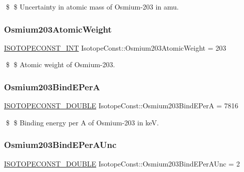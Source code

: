 \$ \$ Uncertainty in atomic mass of Osmium-\/203 in amu. \mbox{\label{group___isotope_const-_osmium-_os203_ga664f298f5b8b5d7513dc6c70eebc9fa4}} 
\subsubsection{\texorpdfstring{Osmium203\+Atomic\+Weight}{Osmium203AtomicWeight}}
{\footnotesize\ttfamily \mbox{\hyperlink{group___isotope_const-_macros_ga5f18360b3e99483a35c32d789e62621c}{I\+S\+O\+T\+O\+P\+E\+C\+O\+N\+S\+T\+\_\+\+I\+NT}} Isotope\+Const\+::\+Osmium203\+Atomic\+Weight = 203}

\$ \$ Atomic weight of Osmium-\/203. \mbox{\label{group___isotope_const-_osmium-_os203_gafa7d3682e9b466a6c3dd6be62c3f1786}} 
\subsubsection{\texorpdfstring{Osmium203\+Bind\+E\+PerA}{Osmium203BindEPerA}}
{\footnotesize\ttfamily \mbox{\hyperlink{group___isotope_const-_macros_ga8f45a7272ce02c0b4c65c44636ed719a}{I\+S\+O\+T\+O\+P\+E\+C\+O\+N\+S\+T\+\_\+\+D\+O\+U\+B\+LE}} Isotope\+Const\+::\+Osmium203\+Bind\+E\+PerA = 7816}

\$ \$ Binding energy per A of Osmium-\/203 in keV. \mbox{\label{group___isotope_const-_osmium-_os203_ga9592977eba787eabb44dea6702861578}} 
\subsubsection{\texorpdfstring{Osmium203\+Bind\+E\+Per\+A\+Unc}{Osmium203BindEPerAUnc}}
{\footnotesize\ttfamily \mbox{\hyperlink{group___isotope_const-_macros_ga8f45a7272ce02c0b4c65c44636ed719a}{I\+S\+O\+T\+O\+P\+E\+C\+O\+N\+S\+T\+\_\+\+D\+O\+U\+B\+LE}} Isotope\+Const\+::\+Osmium203\+Bind\+E\+Per\+A\+Unc = 2}

